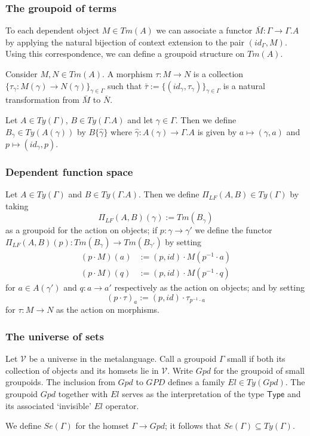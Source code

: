 \documentclass[handout,xcolor=dvipsnames]{beamer}
\renewcommand\type{\mathsf{Type}}
\begin{document}
\begin{frame}
  \frametitle{The groupoid of terms}
To each dependent object $M\in Tm(A)$ we can associate a functor
$\bar{M}:\Gamma\to\Gamma.A$ by applying the natural bijection of context
extension to the pair $(id_\Gamma,M)$. Using this correspondence, we can define
a groupoid structure on $Tm(A)$.

\begin{definition}
Consider $M,N\in Tm(A)$. A morphism $\tau:M\to N$ is a collection
$\{\tau_\gamma:M(\gamma)\to N(\gamma)\}_{\gamma\in\Gamma}$ such that $\bar{\tau}
:=\{(id_\gamma,\tau_\gamma)\}_{\gamma\in\Gamma}$ is a natural transformation from
$\bar{M}$ to $\bar{N}$.
\end{definition}

\begin{definition}
Let $A\in Ty(\Gamma)$, $B\in Ty(\Gamma.A)$ and let $\gamma\in\Gamma$. Then we
define $B_\gamma\in Ty(A(\gamma))$ by $B\{\hat{\gamma}\}$ where $\hat{\gamma}
:A(\gamma)\to\Gamma.A$ is given by $a\mapsto (\gamma,a)$ and $p\mapsto(id_\gamma,p)$. 
\end{definition}
\end{frame}

\begin{frame}
  \frametitle{Dependent function space}
\begin{definition}
Let $A\in Ty(\Gamma)$ and $B\in Ty(\Gamma.A)$. Then we define $\Pi_{LF}(A,B)\in
Ty(\Gamma)$ by taking
\begin{equation*}
\Pi_{LF}(A,B)(\gamma):= Tm(B_\gamma)
\end{equation*}
as a groupoid for the action on objects; if $p:\gamma\to\gamma'$ 
we define the functor $\Pi_{LF}(A,B)(p):Tm(B_\gamma)\to Tm(B_{\gamma'})$ by setting
\begin{align*}
(p\cdot M)(a) & := (p,id)\cdot M(p^{-1}\cdot a)\\
(p\cdot M)(q) & := (p,id)\cdot M(p^{-1}\cdot q)
\end{align*}
for $a\in A(\gamma')$ and $q:a\to a'$ respectively as the action on objects; and by
setting
\begin{equation*}
(p\cdot\tau)_a := (p,id)\cdot \tau_{p^{-1}\cdot a}
\end{equation*}
for $\tau:M\to N$ as the action on morphisms.
\end{definition}
\end{frame}

\begin{frame}
  \frametitle{The universe of sets}
Let $\mathcal{V}$ be a universe in the metalanguage. Call a groupoid $\Gamma$ small
if both its collection of objects and its homsets lie in $\mathcal{V}$. Write $Gpd$ for
the groupoid of small groupoids. The inclusion from $Gpd$ to $GPD$ defines a family
$El\in Ty(Gpd)$. The groupoid $Gpd$ together with $El$ serves as the interpretation
of the type $\type$ and its associated `invisible' $El$ operator.

We define $Se(\Gamma)$ for the homset $\Gamma\to Gpd$; it follows that $Se(\Gamma)
\subseteq Ty(\Gamma)$. 
\end{frame}
\end{document}
